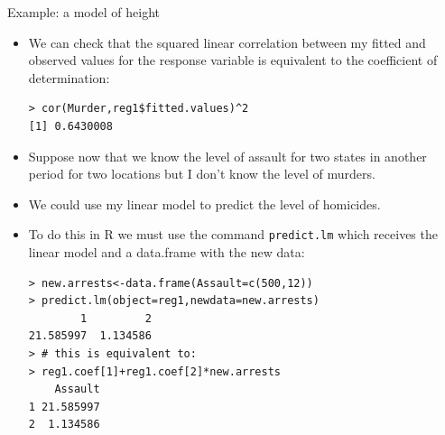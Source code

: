 \documentclass[handout]{beamer}
\begin{document}
\begin{frame}[fragile]{Example: a model of height}
\scriptsize{
\begin{itemize}
 \item We can check that the squared linear correlation between my fitted and observed values for the response variable is equivalent to the coefficient of determination:
 
 \begin{verbatim}
> cor(Murder,reg1$fitted.values)^2
[1] 0.6430008
 \end{verbatim}

\item  Suppose now that we know the level of assault for two states in another period for two locations but I don't know the level of murders.

\item  We could use my linear model to predict the level of homicides.

\item To do this in R we must use the command \verb+predict.lm+ which receives the linear model and a data.frame with the new data:
\begin{verbatim}
> new.arrests<-data.frame(Assault=c(500,12))
> predict.lm(object=reg1,newdata=new.arrests)
        1         2 
21.585997  1.134586 
> # this is equivalent to:
> reg1.coef[1]+reg1.coef[2]*new.arrests
    Assault
1 21.585997
2  1.134586 
\end{verbatim}

 
 \end{itemize}
 

} 
\end{frame}
\end{document}
